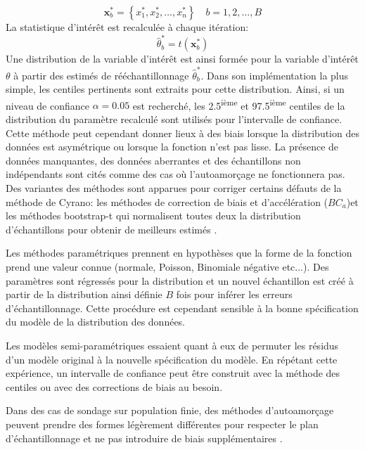         \begin{equation}
            \mathbf{x}^*_b = \left\{ x_1^*,x_2^*,\ldots,x_n^*\right\} \quad b = 1,2,\ldots,B
        \end{equation}
        La statistique d'intérêt est recalculée à chaque itération:
        \begin{equation}
            \hat\theta^*_b = t(\mathbf{x}^*_b)
        \end{equation}
        Une distribution de la variable d'intérêt est ainsi formée pour la variable d'intérêt $\theta$ à partir des estimés de rééchantillonnage $\hat\theta^*_b$. Dans son implémentation la plus simple, les centiles pertinents sont extraits pour cette distribution. Ainsi, si un niveau de confiance $\alpha=0.05$ est recherché, les 2.5\textsuperscript{ième} et 97.5\textsuperscript{ième} centiles de la distribution du paramètre recalculé sont utilisés pour l'intervalle de confiance. Cette méthode peut cependant donner lieux à des biais lorsque la distribution des données est asymétrique ou lorsque la fonction n'est pas lisse. La présence de données manquantes, des données aberrantes et des échantillons non indépendants sont cités comme des cas où l'autoamorçage ne fonctionnera pas\parencite{davison_bootstrap_1999}. Des variantes des méthodes sont apparues pour corriger certains défauts de la méthode de Cyrano: les méthodes de correction de biais et d'accélération ($BC_a$)et les méthodes bootstrap-t qui normalisent toutes deux la distribution d'échantillons pour obtenir de meilleurs estimés \parencite{diciccio_bootstrap_1996}. \par
        Les méthodes paramétriques prennent en hypothèses que la forme de la fonction prend une valeur connue (normale, Poisson, Binomiale négative etc...). Des paramètres sont régressés pour la distribution et un nouvel échantillon est créé à partir de la distribution ainsi définie $B$ fois pour inférer les erreurs d'échantillonnage. Cette procédure est cependant sensible à la bonne spécification du modèle de la distribution des données. \par
        Les modèles semi-paramétriques essaient quant à eux de permuter les résidus d'un  modèle original à la nouvelle spécification du modèle. En répétant cette expérience, un intervalle de confiance peut être construit avec la méthode des centiles ou avec des corrections de biais au besoin. \par
        Dans des cas de sondage sur population finie, des méthodes d'autoamorçage peuvent prendre des formes légèrement différentes pour respecter le plan d'échantillonnage et ne pas introduire de biais supplémentaires \parencite{mashreghi_survey_2016}.
        
